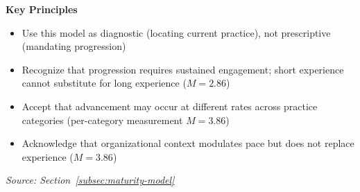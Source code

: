 \vspace{0.5em}
\textbf{Key Principles}
\begin{itemize}[label=\checkbox]
    \item Use this model as diagnostic (locating current practice), not prescriptive (mandating progression)
    \item Recognize that progression requires sustained engagement; short experience cannot substitute for long experience ($M = 2.86$)
    \item Accept that advancement may occur at different rates across practice categories (per-category measurement $M = 3.86$)
    \item Acknowledge that organizational context modulates pace but does not replace experience ($M = 3.86$)
\end{itemize}

\vspace{0.5em}
\textit{Source: Section~\ref{subsec:maturity-model}}
